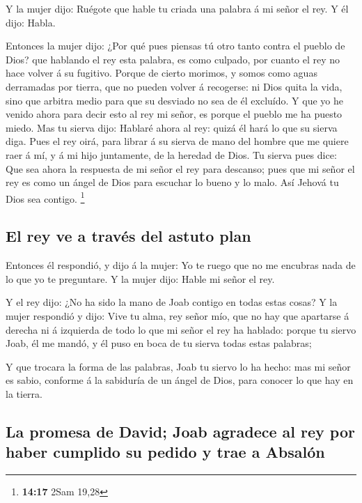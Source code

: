  Y la mujer dijo: Ruégote que hable tu criada una palabra
á mi señor el rey. Y él dijo: Habla.

 Entonces la mujer dijo: ¿Por qué pues piensas tú otro
tanto contra el pueblo de Dios? que hablando el rey esta palabra, es
como culpado, por cuanto el rey no hace volver á su fugitivo.
 Porque de cierto morimos, y somos como aguas derramadas
por tierra, que no pueden volver á recogerse: ni Dios quita la vida,
sino que arbitra medio para que su desviado no sea de él excluído.
 Y que yo he venido ahora para decir esto al rey mi
señor, es porque el pueblo me ha puesto miedo. Mas tu sierva dijo:
Hablaré ahora al rey: quizá él hará lo que su sierva diga.
 Pues el rey oirá, para librar á su sierva de mano del
hombre que me quiere raer á mí, y á mi hijo juntamente, de la heredad de
Dios.  Tu sierva pues dice: Que sea ahora la respuesta de
mi señor el rey para descanso; pues que mi señor el rey es como un ángel
de Dios para escuchar lo bueno y lo malo. Así Jehová tu Dios sea
contigo. \footnote{\textbf{14:17} 2Sam 19,28}

\hypertarget{el-rey-ve-a-travuxe9s-del-astuto-plan}{%
\subsection{El rey ve a través del astuto
plan}\label{el-rey-ve-a-travuxe9s-del-astuto-plan}}

 Entonces él respondió, y dijo á la mujer: Yo te ruego
que no me encubras nada de lo que yo te preguntare. Y la mujer dijo:
Hable mi señor el rey.

 Y el rey dijo: ¿No ha sido la mano de Joab contigo en
todas estas cosas? Y la mujer respondió y dijo: Vive tu alma, rey señor
mío, que no hay que apartarse á derecha ni á izquierda de todo lo que mi
señor el rey ha hablado: porque tu siervo Joab, él me mandó, y él puso
en boca de tu sierva todas estas palabras;

 Y que trocara la forma de las palabras, Joab tu siervo
lo ha hecho: mas mi señor es sabio, conforme á la sabiduría de un ángel
de Dios, para conocer lo que hay en la tierra.

\hypertarget{la-promesa-de-david-joab-agradece-al-rey-por-haber-cumplido-su-pedido-y-trae-a-absaluxf3n}{%
\subsection{La promesa de David; Joab agradece al rey por haber cumplido
su pedido y trae a
Absalón}\label{la-promesa-de-david-joab-agradece-al-rey-por-haber-cumplido-su-pedido-y-trae-a-absaluxf3n}}

